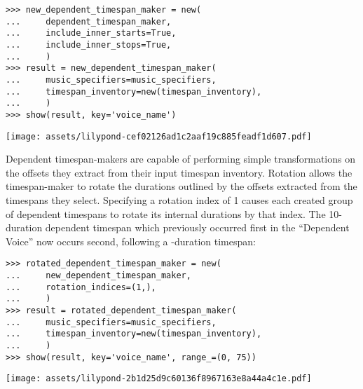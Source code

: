 \begin{abjadbookoutput}
\begin{singlespacing}
\vspace{-0.5\baselineskip}
\begin{verbatim}
>>> new_dependent_timespan_maker = new(
...     dependent_timespan_maker,
...     include_inner_starts=True,
...     include_inner_stops=True,
...     )
>>> result = new_dependent_timespan_maker(
...     music_specifiers=music_specifiers,
...     timespan_inventory=new(timespan_inventory),
...     )
>>> show(result, key='voice_name')
\end{verbatim}
\noindent\texttt{[image: assets/lilypond-cef02126ad1c2aaf19c885feadf1d607.pdf]}
\end{singlespacing}
\end{abjadbookoutput}

\noindent Dependent timespan-makers are capable of performing simple
transformations on the offsets they extract from their input timespan
inventory. Rotation allows the timespan-maker to rotate the durations outlined
by the offsets extracted from the timespans they select. Specifying a rotation
index of 1 causes each created group of dependent timespans to rotate its
internal durations by that index. The 10-duration dependent timespan which
previously occurred first in the \enquote{Dependent Voice} now occurs second,
following a -duration timespan:

\begin{comment}
<abjad>
rotated_dependent_timespan_maker = new(
    new_dependent_timespan_maker,
    rotation_indices=(1,),
    )
result = rotated_dependent_timespan_maker(
    music_specifiers=music_specifiers,
    timespan_inventory=new(timespan_inventory),
    )
show(result, key='voice_name', range_=(0, 75))
</abjad>
\end{comment}

\begin{abjadbookoutput}
\begin{singlespacing}
\vspace{-0.5\baselineskip}
\begin{verbatim}
>>> rotated_dependent_timespan_maker = new(
...     new_dependent_timespan_maker,
...     rotation_indices=(1,),
...     )
>>> result = rotated_dependent_timespan_maker(
...     music_specifiers=music_specifiers,
...     timespan_inventory=new(timespan_inventory),
...     )
>>> show(result, key='voice_name', range_=(0, 75))
\end{verbatim}
\noindent\texttt{[image: assets/lilypond-2b1d25d9c60136f8967163e8a44a4c1e.pdf]}
\end{singlespacing}
\end{abjadbookoutput}

